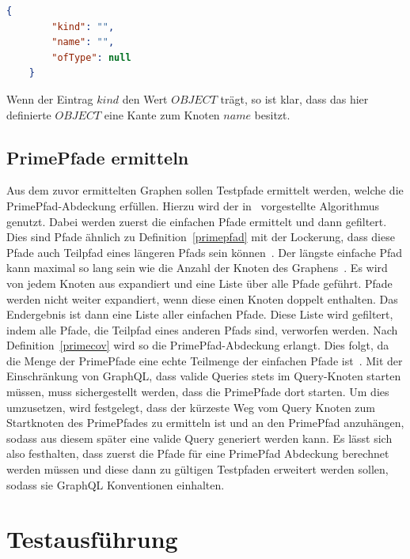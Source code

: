 \begin{lstlisting}[language=json, caption={Type-Field},captionpos=b, label={typefiel}]
    {
        "kind": "",
        "name": "",
        "ofType": null
    }
\end{lstlisting}

Wenn der Eintrag $kind$ den Wert $OBJECT$ trägt, so ist klar, dass das hier definierte $OBJECT$ eine Kante zum Knoten $name$ besitzt.

\subsection{PrimePfade ermitteln}
\label{testpfade}

Aus dem zuvor ermittelten Graphen sollen Testpfade ermittelt werden, welche die PrimePfad-Abdeckung erfüllen.
Hierzu wird der in~\cite[Finding Prime Test Paths]{software-testing} vorgestellte Algorithmus genutzt.
Dabei werden zuerst die einfachen Pfade ermittelt und dann gefiltert.
Dies sind Pfade ähnlich zu Definition~\ref{primepfad} mit der Lockerung, dass diese Pfade auch Teilpfad eines längeren Pfads sein können~\cite[vgl. S. 35]{software-testing}.
Der längste einfache Pfad kann maximal so lang sein wie die Anzahl der Knoten des Graphens~\cite[vgl. S.41 ]{software-testing}.
Es wird von jedem Knoten aus expandiert und eine Liste über alle Pfade geführt.
Pfade werden nicht weiter expandiert, wenn diese einen Knoten doppelt enthalten.
Das Endergebnis ist dann eine Liste aller einfachen Pfade.
Diese Liste wird gefiltert, indem alle Pfade, die Teilpfad eines anderen Pfads sind, verworfen werden.
Nach Definition~\ref{primecov} wird so die PrimePfad-Abdeckung erlangt.
Dies folgt, da die Menge der PrimePfade eine echte Teilmenge der einfachen Pfade ist~\cite[vgl. S. 35]{software-testing}.
Mit der Einschränkung von GraphQL, dass valide Queries stets im Query-Knoten starten müssen, muss sichergestellt werden, dass die PrimePfade dort starten.
Um dies umzusetzen, wird festgelegt, dass der kürzeste Weg vom Query Knoten zum Startknoten des PrimePfades zu ermitteln ist und an den PrimePfad anzuhängen,
sodass aus diesem später eine valide Query generiert werden kann.
Es lässt sich also festhalten, dass zuerst die Pfade für eine PrimePfad Abdeckung berechnet werden müssen
und diese dann zu gültigen Testpfaden erweitert werden sollen, sodass sie GraphQL Konventionen einhalten.

\newpage
\section{Testausführung}

